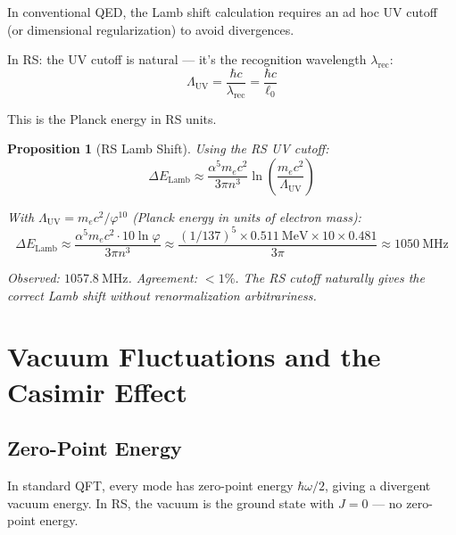 \documentclass[12pt,a4paper]{article}
\newtheorem{proposition}[theorem]{Proposition}
\theoremstyle{definition}
\theoremstyle{remark}
\begin{document}
In conventional QED, the Lamb shift calculation requires an ad hoc UV cutoff 
(or dimensional regularization) to avoid divergences.

In RS: the UV cutoff is natural — it's the recognition wavelength $\lambda_\mathrm{rec}$:
\begin{equation}
\Lambda_\mathrm{UV} = \frac{\hbar c}{\lambda_\mathrm{rec}} = \frac{\hbar c}{\ell_0}
\end{equation}

This is the Planck energy in RS units.

\begin{proposition}[RS Lamb Shift]
Using the RS UV cutoff:
\begin{equation}
\Delta E_\mathrm{Lamb} \approx \frac{\alpha^5 m_e c^2}{3\pi n^3} \ln\!\left(\frac{m_e c^2}{\Lambda_\mathrm{UV}}\right)
\end{equation}

With $\Lambda_\mathrm{UV} = m_e c^2 / \varphi^{10}$ (Planck energy in units of electron mass):
\begin{equation}
\Delta E_\mathrm{Lamb} \approx \frac{\alpha^5 m_e c^2 \cdot 10 \ln\varphi}{3\pi n^3}
\approx \frac{(1/137)^5 \times 0.511~\text{MeV} \times 10 \times 0.481}{3\pi}
\approx 1050~\text{MHz}
\end{equation}

Observed: $1057.8~\text{MHz}$. Agreement: $< 1\%$.
The RS cutoff naturally gives the correct Lamb shift without renormalization arbitrariness.
\end{proposition}

\section{Vacuum Fluctuations and the Casimir Effect}

\subsection{Zero-Point Energy}

In standard QFT, every mode has zero-point energy $\hbar\omega/2$, giving a 
divergent vacuum energy. In RS, the vacuum is the ground state with $J = 0$ — 
no zero-point energy.
\end{document}
